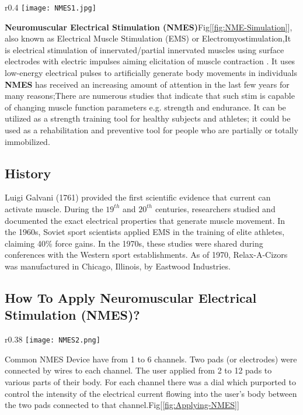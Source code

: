 \documentclass[12pt]{article}
\begin{document}
 \begin{wrapfigure}{r}{0.4\textwidth}
\centering
\hspace{-1.2cm} \vspace{-2mm}
    \texttt{[image: NMES1.jpg]}
    \caption{ NME Simulation}
    \label{fig:NME-Simulation}
\end{wrapfigure}
 \textbf{Neuromuscular Electrical Stimulation (NMES)}Fig[\ref{fig:NME-Simulation}], also known as Electrical Muscle Stimulation (EMS) or Electromyostimulation,It is electrical stimulation of innervated/partial innervated
muscles using surface electrodes with electric impulses aiming elicitation of muscle contraction . It uses low-energy electrical pulses to artificially generate body movements in individuals\\
\textbf{NMES}
has received an increasing amount of attention in the last few years for many reasons;There are numerous studies that indicate that such stim is capable of changing 
muscle function parameters e.g. strength and endurance. It can be utilized as a strength training tool for healthy subjects and athletes; it could be used as a rehabilitation and preventive tool for people who are partially or totally immobilized.

\subsection{History}

Luigi Galvani (1761) provided the first scientific evidence that current can activate muscle. During the $19^{th}$ and $20^{th}$ centuries, researchers studied and documented the exact electrical properties that generate muscle movement. In the 1960s, Soviet sport scientists applied EMS in the training of elite athletes, claiming 40\% force gains. In the 1970s, these studies were shared during conferences with the Western sport establishments. As of 1970, Relax-A-Cizors was manufactured in Chicago, Illinois, by Eastwood Industries.\cite{wiki:Electrical_muscle_stimulation}


\subsection{How To Apply Neuromuscular Electrical Stimulation (NMES)?}
\begin{wrapfigure}{r}{0.38\textwidth}
\centering
\hspace{-1.2cm} \vspace{-2mm}
    \texttt{[image: NMES2.png]}
    \caption{ Applying NMES}
    \label{fig:Applying-NMES}
\end{wrapfigure}
Common NMES Device have from 1 to 6 channels. Two pads (or electrodes) were connected by wires to each channel. The user applied from 2 to 12 pads to various parts of their body. For each channel there was a dial which purported to control the intensity of the electrical current flowing into the user's body between the two pads connected to that channel.Fig[\ref{fig:Applying-NMES}]
\end{document}
